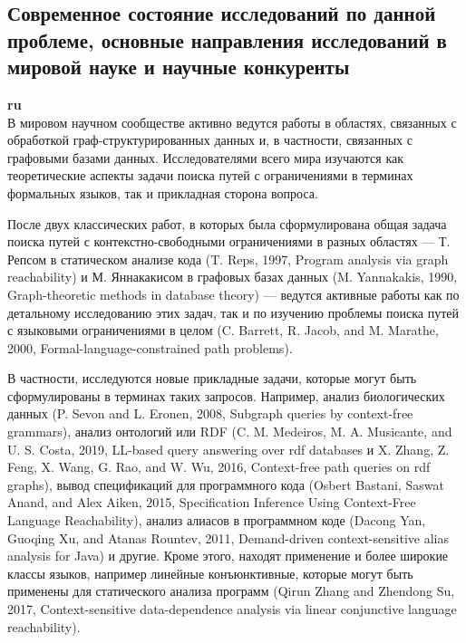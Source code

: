 \documentclass[12pt]{article}  %
\theoremstyle{remark}
\begin{document}
\subsection{Современное состояние исследований по данной проблеме, основные направления исследований в мировой науке и научные конкуренты}

\textbf{ru}\\
%
В мировом научном сообществе активно ведутся работы в областях, связанных с обработкой граф-структурированных данных и, в частности, связанных с графовыми базами данных. Исследователями всего мира изучаются как теоретические аспекты задачи поиска путей с ограничениями в терминах формальных языков, так и прикладная сторона вопроса.

После двух классических работ, в которых была сформулирована общая задача поиска путей с контекстно-свободными ограничениями в разных областях --- Т. Репсом в статическом анализе кода (T. Reps, 1997, Program analysis via graph reachability) и М. Яннакакисом в графовых базах данных (M. Yannakakis, 1990, Graph-theoretic methods in database theory) --- ведутся активные работы как по детальному исследованию этих задач, так и по изучению проблемы поиска путей с языковыми ограничениями в целом (C. Barrett, R. Jacob, and M. Marathe, 2000, Formal-language-constrained path problems).

В частности, исследуются новые прикладные задачи, которые могут быть сформулированы в терминах таких запросов. Например, анализ биологических данных (P. Sevon and L. Eronen, 2008, Subgraph queries by context-free grammars), анализ онтологий или RDF (C. M. Medeiros, M. A. Musicante, and U. S. Costa, 2019, LL-based query answering over rdf databases и X. Zhang, Z. Feng, X. Wang, G. Rao, and W. Wu, 2016, Context-free path queries on rdf graphs), вывод спецификаций для программного кода (Osbert Bastani, Saswat Anand, and Alex Aiken, 2015, Specification Inference Using Context-Free Language Reachability), анализ алиасов в программном коде (Dacong Yan, Guoqing Xu, and Atanas Rountev, 2011, Demand-driven context-sensitive alias analysis for Java) и другие. Кроме этого, находят применение и более широкие классы языков, например линейные конъюнктивные, которые могут быть применены для статического анализа программ (Qirun Zhang and Zhendong Su, 2017, Context-sensitive data-dependence analysis via linear conjunctive language reachability).
\end{document}
